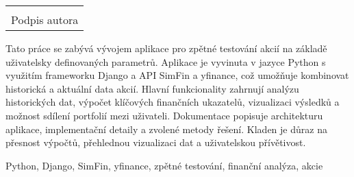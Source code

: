 \documentclass[12pt, a4paper]{report}
\newcommand\datumOdevzdani{31. 12. 2024}
\begin{document}
	\vspace*{0.7\textheight} %

	\vfill
	\noindent{V Opavě \datumOdevzdani\\}
	\noindent
	\begin{minipage}{\linewidth}
		\hspace{9.5cm} 
		\begin{tabular}{@{}p{6cm}@{}}
			\dotfill \\
			Podpis autora
		\end{tabular}
	\end{minipage}
	
	\clearpage

	\tableofcontents
	\clearpage
Tato práce se zabývá vývojem aplikace pro zpětné testování akcií na základě uživatelsky definovaných parametrů. Aplikace je vyvinuta v jazyce Python s využitím frameworku Django a API SimFin a yfinance, což umožňuje kombinovat historická a aktuální data akcií. Hlavní funkcionality zahrnují analýzu historických dat, výpočet klíčových finančních ukazatelů, vizualizaci výsledků a možnost sdílení portfolií mezi uživateli. Dokumentace popisuje architekturu aplikace, implementační detaily a zvolené metody řešení. Kladen je důraz na přesnost výpočtů, přehlednou vizualizaci dat a uživatelskou přívětivost.

\vspace{18pt}

\noindent Python, Django, SimFin, yfinance, zpětné testování, finanční analýza, akcie


\end{document}
